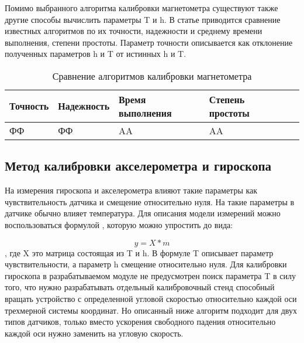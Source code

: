 Помимо выбранного алгоритма калибровки магнетометра существуют также другие способы вычислить параметры T и h. 
В статье %
приводится сравнение известных алгоритмов по их точности, надежности и среднему времени выполнения, степени простоты.
Параметр точности описывается как отклонение полученных параметров h и T от истинных h и T.

\begin{table}[ht]
    \caption{Сравнение алгоритмов калибровки магнетометра}
    \label{table:domain:magnet_calib_comp}
    \begin{tabular}{| >{\raggedright}m{}
                    | >{\raggedright\arraybackslash}m{}|
                    | >{\raggedright\arraybackslash}m{}|
                    | >{\raggedright\arraybackslash}m{}|
                    | >{\raggedright\arraybackslash}m{}|}
        \hline
        \centering Точность & 
        \centering\arraybackslash Надежность &
        \centering\arraybackslash Время выполнения &
        \centering\arraybackslash Степень простоты
        \\

        \hline
        ФФ & ФФ & AA & AA \\

        \hline
    \end{tabular}
\end{table}


\subsection{Метод калибровки акселерометра и гироскопа}

На измерения гироскопа и акселерометра влияют такие параметры как чувствительность датчика и смещение относительно нуля.
На такие параметры в датчике обычно влияет температура.
Для описания модели измерений можно воспользоваться формулой %
, которую можно упростить до вида:

$$ y = X*m $$
, где X это матрица состоящая из T и h.
В формуле T описывает параметр чувствительности, а параметр h смещение относительно нуля.
Для калибровки гироскопа в разрабатываемом модуле не предусмотрен поиск параметра T в силу того, 
что нужно разрабатывать отдельный калибровочный стенд способный вращать устройство с определенной 
угловой скоростью относительно каждой оси трехмерной системы координат. Но описанный ниже алгоритм подходит для двух типов датчиков, 
только вместо ускорения свободного падения относительно каждой оси нужно заменить на угловую скорость.

